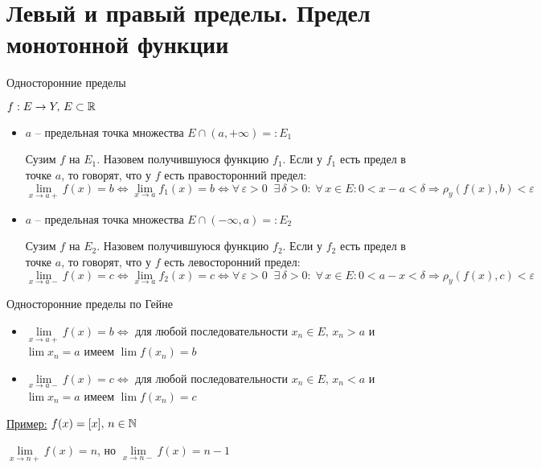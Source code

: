 \section{Левый и правый пределы. Предел монотонной функции}

\vspace{7mm}

\begin{conj}
    Односторонние пределы
\end{conj}
$f : E \to Y, \, E \subset \mathbb{R}$
\begin{itemize}
    \item $a$ -- предельная точка множества $E \cap (a, +\infty) =: E_1$
    
    Сузим $f$ на $E_1$. Назовем получившуюся функцию $f_1$. 
    Если у $f_1$ есть предел в точке $a$, то говорят, что у $f$ есть правосторонний предел:
    \[ \lim_{x \to a+} f(x) = b \Longleftrightarrow \lim_{x \to a} f_1(x) = b \Longleftrightarrow 
    \forall \, \varepsilon > 0 \;\; \exists \, \delta > 0 : \; \forall \, x \in E : 0 < x - a < \delta \Rightarrow\rho_y(f(x), b) < \varepsilon \]
    
    \item $a$ -- предельная точка множества $E \cap (-\infty, a) =: E_2$
    
    Сузим $f$ на $E_2$. Назовем получившуюся функцию $f_2$.
    Если у $f_2$ есть предел в точке $a$, то говорят, что у $f$ есть левосторонний предел:
    \[ \lim_{x \to a-} f(x) = c \Longleftrightarrow \lim_{x \to a} f_2(x) = c \Longleftrightarrow 
    \forall \, \varepsilon > 0 \;\; \exists \, \delta > 0 : \; \forall \, x \in E : 0 < a - x < \delta \Rightarrow\rho_y(f(x), c) < \varepsilon \]
\end{itemize}
\begin{conj}
    Односторонние пределы по Гейне
\end{conj}
\begin{itemize}
    \item $\lim\limits_{x \to a+} f(x) = b \Longleftrightarrow$ для любой последовательности $x_n \in E, \, x_n > a$ и $\lim x_n = a$ имеем $\lim f(x_n) = b$
    \item $\lim\limits_{x \to a-} f(x) = c \Longleftrightarrow$ для любой последовательности $x_n \in E, \, x_n < a$ и $\lim x_n = a$ имеем $\lim f(x_n) = c$
\end{itemize}
\underline{Пример:} $f(x) = [x], \, n \in \mathbb{N}$

$\lim\limits_{x \to n+} f(x) = n$, но $\lim\limits_{x \to n-} f(x) = n - 1$

